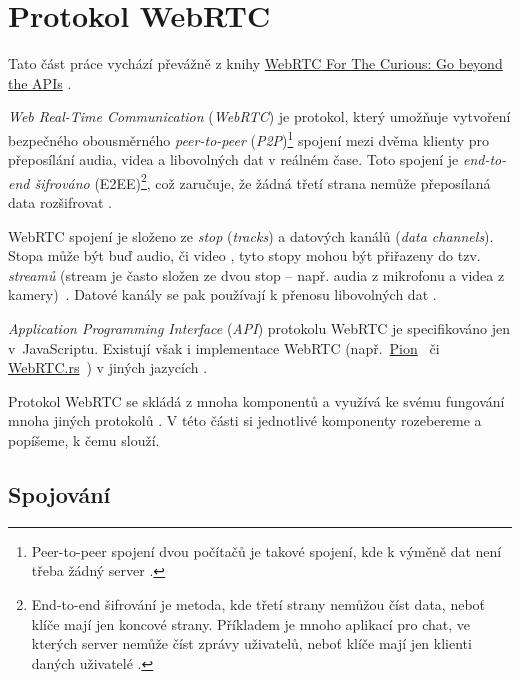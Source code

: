 
\section{Protokol WebRTC}\label{webRTC}

Tato část práce vychází převážně z knihy
\href{https://webrtcforthecurious.com/}{WebRTC For The Curious: Go beyond the
	APIs} \cite{WebRTCForTheCurious}.

\textit{Web Real-Time Communication} (\textit{WebRTC}) je protokol, který
umožňuje vytvoření bezpečného obousměrného \textit{peer-to-peer}
(\textit{P2P})\footnote{Peer-to-peer spojení dvou počítačů je takové spojení,
kde k výměně dat není třeba žádný server \cite{MerriamWebster-PeerToPeer}.}
spojení mezi dvěma klienty pro přeposílání audia, videa a libovolných dat v
reálném čase. Toto spojení je \textit{end-to-end šifrováno}
(E2EE)\footnote{End-to-end šifrování je metoda, kde třetí strany nemůžou číst
data, neboť klíče mají jen koncové strany. Příkladem je mnoho aplikací pro chat,
ve kterých server nemůže číst zprávy uživatelů, neboť klíče mají jen klienti
daných uživatelé \cite{IBM-EndToEndEncryption}.}, což zaručuje, že žádná třetí
strana nemůže přeposílaná data rozšifrovat \cite{WebRTCForTheCurious}.

WebRTC spojení je složeno ze \textit{stop} (\textit{tracks}) a datových kanálů
(\textit{data channels}). Stopa může být buď audio, či video
\cite{MDN-WebRTC-MediaStreamTrack}, tyto stopy mohou být přiřazeny do tzv.
\textit{streamů} (stream je často složen ze dvou stop -- např. audia z mikrofonu
a videa z kamery)~\cite{MDN-WebRTC-MediaStream}. Datové kanály se pak používají
k přenosu libovolných dat \cite{WebRTCORG-GettingStarted-DataChannels}.

\textit{Application Programming Interface} (\textit{API}) protokolu WebRTC je
specifikováno jen v~JavaScriptu. Existují však i implementace WebRTC
(např.~\href{https://github.com/pion/webrtc}{Pion}~\cite{GitHub-Pion-WebRTC} či
\href{https://github.com/webrtc-rs/webrtc}{WebRTC.rs}~\cite{GitHub-WebRTCRS-WebRTC})
v jiných jazycích \cite{WebRTCForTheCurious}.

Protokol WebRTC se skládá z mnoha komponentů a využívá ke svému fungování mnoha
jiných protokolů \cite{WebRTCForTheCurious}. V této části si jednotlivé
komponenty rozebereme a popíšeme, k čemu slouží.

\subsection{Spojování}\label{connecting}

